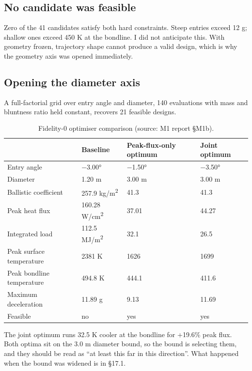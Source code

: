 \documentclass[
  a4paper,
  11pt]{article}
\newcommand{\tabhead}[1]{{\sffamily\bfseries\fontsize{8.5}{10.5}\selectfont #1}}
\begin{document}
\subsection{No candidate was feasible}

Zero of the 41 candidates satisfy both hard constraints. Steep entries
exceed 12 g; shallow ones exceed 450 K at the bondline. I did not
anticipate this. With geometry frozen, trajectory shape cannot produce a
valid design, which is why the geometry axis was opened immediately.

\subsection{Opening the diameter axis}

A full-factorial grid over entry angle and diameter, 140 evaluations
with mass and bluntness ratio held constant, recovers 21 feasible
designs.

\begin{table}[htbp]
\caption{Fidelity-0 optimiser comparison (source: M1 report §M1b).}
\small\centering
\begin{tabular}{@{}llll@{}}
\toprule
 & \tabhead{Baseline} & \tabhead{Peak-flux-only optimum} & \tabhead{Joint optimum} \\
\midrule
Entry angle & −3.00° & −1.50° & −3.50° \\
Diameter & 1.20 m & 3.00 m & 3.00 m \\
Ballistic coefficient & 257.9 kg/m\textsuperscript{2} & 41.3 & 41.3 \\
Peak heat flux & 160.28 W/cm\textsuperscript{2} & 37.01 & 44.27 \\
Integrated load & 112.5 MJ/m\textsuperscript{2} & 32.1 & 26.5 \\
Peak surface temperature & 2381 K & 1626 & 1699 \\
Peak bondline temperature & 494.8 K & 444.1 & 411.6 \\
Maximum deceleration & 11.89 g & 9.13 & 11.69 \\
Feasible & no & yes & yes \\
\bottomrule
\end{tabular}
\end{table}

The joint optimum runs 32.5 K cooler at the bondline for +19.6\% peak
flux. Both optima sit on the 3.0 m diameter bound, so the bound is
selecting them, and they should be read as ``at least this far in this
direction''. What happened when the bound was widened is in §17.1.
\end{document}
